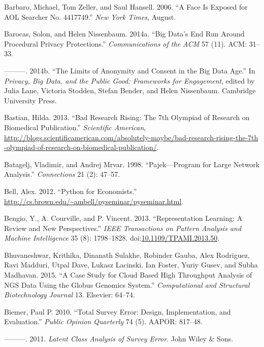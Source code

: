 \documentclass[]{krantz}
\begin{document}
\hypertarget{ref-barbaro2006face}{}
Barbaro, Michael, Tom Zeller, and Saul Hansell. 2006. ``A Face Is
Exposed for AOL Searcher No. 4417749.'' \emph{New York Times}, August.

\hypertarget{ref-barocas2014big}{}
Barocas, Solon, and Helen Nissenbaum. 2014a. ``Big Data's End Run Around
Procedural Privacy Protections.'' \emph{Communications of the ACM} 57
(11). ACM: 31--33.

\hypertarget{ref-barocas2014bigger}{}
---------. 2014b. ``The Limits of Anonymity and Consent in the Big Data
Age.'' In \emph{Privacy, Big Data, and the Public Good: Frameworks for
Engagement}, edited by Julia Lane, Victoria Stodden, Stefan Bender, and
Helen Nissenbaum. Cambridge University Press.

\hypertarget{ref-Bastian2013}{}
Bastian, Hilda. 2013. ``Bad Research Rising: The 7th Olympiad of
Research on Biomedical Publication.'' \emph{Scientific American},
\url{http://blogs.scientificamerican.com/absolutely-maybe/bad-research-rising-the-7th}
\url{-olympiad-of-research-on-biomedical-publication/}.

\hypertarget{ref-batagelj1998pajek}{}
Batagelj, Vladimir, and Andrej Mrvar. 1998. ``Pajek---Program for Large
Network Analysis.'' \emph{Connections} 21 (2): 47--57.

\hypertarget{ref-BellPython}{}
Bell, Alex. 2012. ``Python for Economists.''
\url{http://cs.brown.edu/~ambell/pyseminar/pyseminar.html}.

\hypertarget{ref-bengio-13}{}
Bengio, Y., A. Courville, and P. Vincent. 2013. ``Representation
Learning: A Review and New Perspectives.'' \emph{IEEE Transactions on
Pattern Analysis and Machine Intelligence} 35 (8): 1798--1828.
doi:\href{https://doi.org/10.1109/TPAMI.2013.50}{10.1109/TPAMI.2013.50}.

\hypertarget{ref-bhuvaneshwar2015case}{}
Bhuvaneshwar, Krithika, Dinanath Sulakhe, Robinder Gauba, Alex
Rodriguez, Ravi Madduri, Utpal Dave, Lukasz Lacinski, Ian Foster, Yuriy
Gusev, and Subha Madhavan. 2015. ``A Case Study for Cloud Based High
Throughput Analysis of NGS Data Using the Globus Genomics System.''
\emph{Computational and Structural Biotechnology Journal} 13. Elsevier:
64--74.

\hypertarget{ref-biemer2010total}{}
Biemer, Paul P. 2010. ``Total Survey Error: Design, Implementation, and
Evaluation.'' \emph{Public Opinion Quarterly} 74 (5). AAPOR: 817--48.

\hypertarget{ref-biemer2011latent}{}
---------. 2011. \emph{Latent Class Analysis of Survey Error}. John
Wiley \& Sons.
\end{document}
